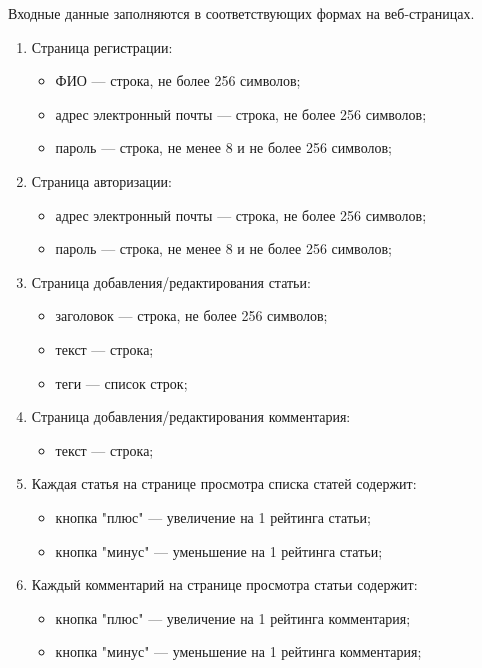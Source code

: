 \documentclass{bmstu-gost-7-32}
\begin{document}
Входные данные заполняются в соответствующих формах на веб-страницах.
\begin{enumerate}
	\item Страница регистрации:
	\begin{itemize}
		\item ФИО — строка, не более 256 символов;
		\item адрес электронный почты — строка, не более 256 символов;
		\item пароль — строка, не менее 8 и не более 256 символов;
	\end{itemize}
	\item Страница авторизации:
	\begin{itemize}
		\item адрес электронный почты — строка, не более 256 символов;
		\item пароль — строка, не менее 8 и не более 256 символов;
	\end{itemize}
	\item Страница добавления/редактирования статьи:
	\begin{itemize}
		\item заголовок — строка, не более 256 символов;
		\item текст — строка;
		\item теги — список строк;
	\end{itemize}
	\item Страница добавления/редактирования комментария:
	\begin{itemize}
		\item текст — строка;
	\end{itemize}
	\item Каждая статья на странице просмотра списка статей содержит:
	\begin{itemize}
		\item кнопка "плюс" — увеличение на 1 рейтинга статьи;
		\item кнопка "минус" — уменьшение на 1 рейтинга статьи;
	\end{itemize}
	\item Каждый комментарий на странице просмотра статьи содержит:
	\begin{itemize}
		\item кнопка "плюс" — увеличение на 1 рейтинга комментария;
		\item кнопка "минус" — уменьшение на 1 рейтинга комментария;
	\end{itemize}
\end{enumerate}
\end{document}
